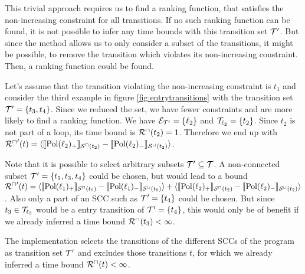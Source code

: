 This trivial approach requires us to find a ranking function, that satisfies the non-increasing constraint for all transitions.
If no such ranking function can be found, it is not possible to infer any time bounds with this transition set $\mathcal{T}'$.
But since the method allows us to only consider a subset of the transitions, it might be possible, to remove the transition which violates its non-increasing constraint.
Then, a ranking function could be found.

Let's assume that the transition violating the non-increasing constraint is $t_1$ and consider the third example in figure \ref{fig:entrytransitions} with the transition set $\mathcal{T}' = \lbrace t_3, t_4 \rbrace$.
Since we reduced the set, we have fewer constraints and are more likely to find a ranking function.
We have $\mathcal{E}_{\mathcal{T}'} = \lbrace \ell_2 \rbrace$ and $\mathcal{T}_{\ell_2} = \lbrace t_2 \rbrace$.
Since $t_2$ is not part of a loop, its time bound is ${\mathcal{R}^\sqcap}(t_2) = 1$.
Therefore we end up with ${\mathcal{R}^\sqcap}'(t) = \langle\llbracket \text{Pol}(\ell_2)_+ \rrbracket_{{\mathcal{S}^\sqcap}(t_2)} - \llbracket \text{Pol}(\ell_2)_- \rrbracket_{{\mathcal{S}^\sqcup}(t_2)}\rangle$.

Note that it is possible to select arbitrary subsets $\mathcal{T}' \subseteq \mathcal{T}$.
A non-connected subset $\mathcal{T}' = \lbrace t_1, t_3, t_4 \rbrace$ could be chosen, but would lead to a bound ${\mathcal{R}^\sqcap}'(t) = \langle\llbracket \text{Pol}(\ell_1)_+ \rrbracket_{{\mathcal{S}^\sqcap}(t_0)} - \llbracket \text{Pol}(\ell_1)_- \rrbracket_{{\mathcal{S}^\sqcup}(t_0)}\rangle + \langle\llbracket \text{Pol}(\ell_2)_+ \rrbracket_{{\mathcal{S}^\sqcap}(t_2)} - \llbracket \text{Pol}(\ell_2)_- \rrbracket_{{\mathcal{S}^\sqcup}(t_2)}\rangle$.
Also only a part of an SCC such as $\mathcal{T}' = \lbrace t_4 \rbrace$ could be chosen.
But since $t_3 \in \mathcal{T}_{\ell_3}$ would be a entry transition of $\mathcal{T}' = \lbrace t_4 \rbrace$, this would only be of benefit if we already inferred a time bound ${\mathcal{R}^\sqcap}(t_3) < \infty$.

The implementation selects the transitions of the different SCCs of the program as transition set $\mathcal{T}'$ and excludes those transitions $t$, for which we already inferred a time bound ${\mathcal{R}^\sqcap}(t) < \infty$.
